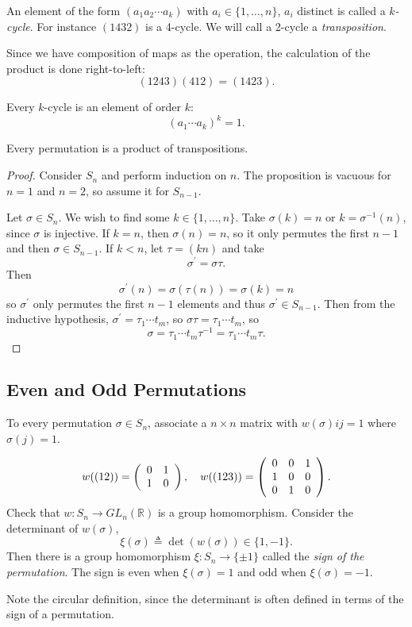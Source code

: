 \documentclass{article}
\begin{document}
\begin{defn}
An element of the form $(a_1 a_2 \cdots a_k)$ with
$a_i \in \{ 1, \dots, n \}$, $a_i$ distinct is called a
\emph{$k$-cycle}.
For instance $(1432)$ is a 4-cycle. We will call a 2-cycle
a \emph{transposition}.
\end{defn}

Since we have composition of maps as the operation, the calculation of
the product is done right-to-left:
$$
(1243)(412) = (1423).
$$

\begin{remark}
Every $k$-cycle is an element of order $k$:
$$
(a_1 \cdots a_k)^k = 1.
$$
\end{remark}

\begin{prop}
Every permutation is a product of transpositions.
\end{prop}
\begin{proof}
Consider $S_n$ and perform induction on $n$. The proposition is
vacuous for $n = 1$ and $n = 2$, so assume it for $S_{n-1}$.

Let $\sigma \in S_n$. We wish to find some $k \in \{1, \dots, n\}$.
Take $\sigma(k) = n$ or $k = \sigma^{-1}(n)$, since $\sigma$ is
injective. If $k = n$, then $\sigma(n) = n$, so it only permutes the
first $n-1$ and then
$\sigma \in S_{n-1}$. If $k < n$, let $\tau = (kn)$ and take
$$
\sigma^\prime = \sigma \tau.
$$
Then
$$
  \sigma^\prime(n)
= \sigma (\tau(n))
= \sigma(k)
= n
$$
so
$\sigma^\prime$ only permutes the first $n-1$ elements and thus
$\sigma^\prime \in S_{n-1}$. Then from the inductive hypothesis,
$\sigma^\prime = \tau_1 \cdots t_m$,
so $\sigma \tau = \tau_1 \cdots t_m$,
so
$$
\sigma
= \tau_1 \cdots t_m \tau^{-1}
= \tau_1 \cdots t_m \tau.
$$
\end{proof}

\subsection*{Even and Odd Permutations}
To every permutation $\sigma \in S_n$, associate a $n \times n$ matrix
with $w(\sigma){ij} = 1$ where $\sigma(j) = 1$.

\begin{xmpl}
$$
w((12)) = \left(\begin{array}{c c}
            0 & 1 \\ 1 & 0
          \end{array}\right), \quad
w((123)) = \left(\begin{array}{c c c}
             0 & 0 & 1 \\ 1 & 0 & 0 \\ 0 & 1 & 0
           \end{array}\right).
$$
Check that $w : S_n \to GL_n(\mathbb{R})$ is a group
homomorphism. Consider the determinant of $w(\sigma)$,
$$
\xi(\sigma) \triangleq \det(w(\sigma)) \in \{1, -1\}.
$$
Then there is a group homomorphism $\xi : S_n \to \{ \pm 1 \}$ called
the \emph{sign of the permutation}. The sign is even when $\xi(\sigma)
= 1$ and odd when $\xi(\sigma) = -1$.

Note the circular definition, since the determinant is often defined
in terms of the sign of a permutation.
\end{xmpl}
\end{document}
